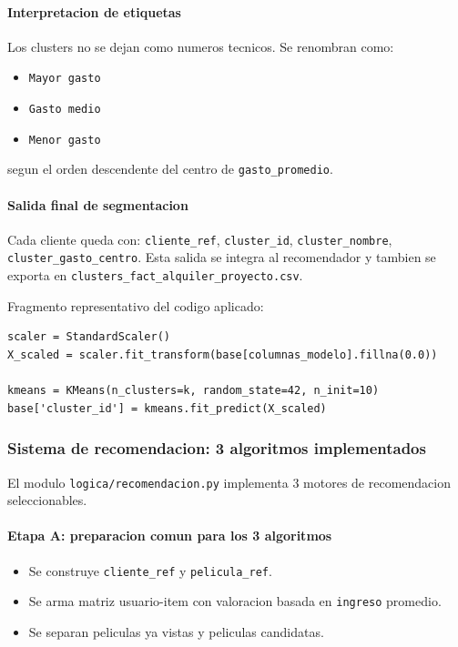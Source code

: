 ﻿\documentclass{article}
\begin{document}
\paragraph{Interpretacion de etiquetas}
Los clusters no se dejan como numeros tecnicos. Se renombran como:
\begin{itemize}
    \item \texttt{Mayor gasto}
    \item \texttt{Gasto medio}
    \item \texttt{Menor gasto}
\end{itemize}
segun el orden descendente del centro de \texttt{gasto\_promedio}.

\paragraph{Salida final de segmentacion}
Cada cliente queda con:
\texttt{cliente\_ref}, \texttt{cluster\_id}, \texttt{cluster\_nombre}, \texttt{cluster\_gasto\_centro}.
Esta salida se integra al recomendador y tambien se exporta en \texttt{clusters\_fact\_alquiler\_proyecto.csv}.

Fragmento representativo del codigo aplicado:
\begin{lstlisting}
scaler = StandardScaler()
X_scaled = scaler.fit_transform(base[columnas_modelo].fillna(0.0))

kmeans = KMeans(n_clusters=k, random_state=42, n_init=10)
base['cluster_id'] = kmeans.fit_predict(X_scaled)
\end{lstlisting}

\subsubsection{Sistema de recomendacion: 3 algoritmos implementados}
El modulo \texttt{logica/recomendacion.py} implementa 3 motores de recomendacion seleccionables.

\paragraph{Etapa A: preparacion comun para los 3 algoritmos}
\begin{itemize}
    \item Se construye \texttt{cliente\_ref} y \texttt{pelicula\_ref}.
    \item Se arma matriz usuario-item con valoracion basada en \texttt{ingreso} promedio.
    \item Se separan peliculas ya vistas y peliculas candidatas.
\end{itemize}
\end{document}
